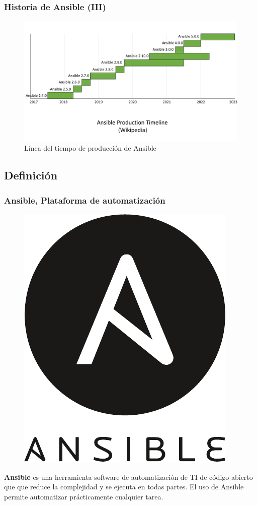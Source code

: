\documentclass[
	11pt, %
]{beamer}
\begin{document}

\begin{frame}
	\frametitle{Historia de Ansible (III)}

	\begin{figure}
		\includegraphics[width=1.0\linewidth]{timeline.pdf}
		\caption{Línea del tiempo de producción de Ansible}
	\end{figure}

\end{frame}


\subsection{Definición}

\begin{frame}
	\frametitle{Ansible, Plataforma de automatización}

	\begin{figure}
		\centering
		\includegraphics[width=0.5\linewidth]{ansible_logo.pdf}
		\label{fig:ansible-logo}
	\end{figure}

	\textbf{Ansible} es una herramienta software de automatización de TI de código abierto que que reduce la complejidad y se ejecuta en todas partes. El uso de Ansible permite automatizar prácticamente cualquier tarea.

\end{frame}
\end{document}
